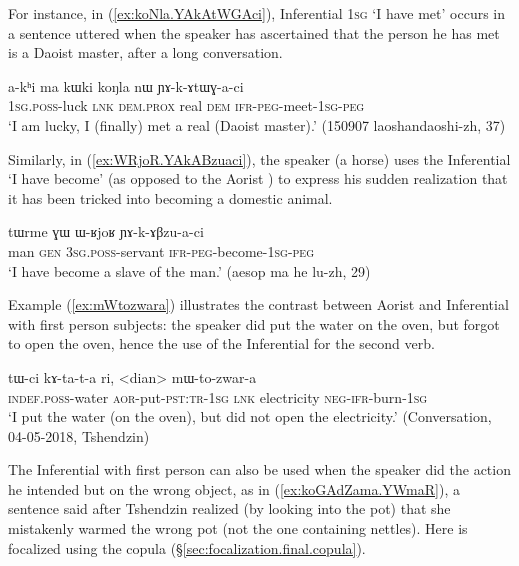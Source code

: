 For instance, in (\ref{ex:koNla.YAkAtWGAci}), Inferential \textsc{1sg}  `I have met' occurs in a sentence uttered when the speaker has ascertained that the person he has met is a Daoist master, after a long conversation.  

\begin{exe}
\ex \label{ex:koNla.YAkAtWGAci}
\gll  a-kʰi ma kɯki koŋla nɯ ɲɤ-k-ɤtɯɣ-a-ci \\
\textsc{1sg}.\textsc{poss}-luck \textsc{lnk} \textsc{dem}.\textsc{prox} real \textsc{dem} \textsc{ifr}-\textsc{peg}-meet-\textsc{1sg}-\textsc{peg} \\
\glt `I am lucky, I (finally) met a real (Daoist master).' (150907 laoshandaoshi-zh, 37)
\end{exe}

Similarly, in (\ref{ex:WRjoR.YAkABzuaci}), the speaker (a horse) uses the Inferential  `I have become' (as opposed to the Aorist ) to express his sudden realization that it has been tricked into becoming a domestic animal.

\begin{exe}
\ex \label{ex:WRjoR.YAkABzuaci}
\gll tɯrme ɣɯ ɯ-ʁjoʁ ɲɤ-k-ɤβzu-a-ci \\
man \textsc{gen} \textsc{3sg}.\textsc{poss}-servant \textsc{ifr}-\textsc{peg}-become-\textsc{1sg}-\textsc{peg} \\
\glt `I have become a slave of the man.' (aesop ma he lu-zh, 29)
\end{exe}

Example (\ref{ex:mWtozwara}) illustrates the contrast between Aorist and Inferential with first person subjects: the speaker did put the water on the oven, but forgot to open the oven, hence the use of the Inferential for the second verb.

\begin{exe}
\ex \label{ex:mWtozwara}
\gll tɯ-ci kɤ-ta-t-a ri, <dian> mɯ-to-zwar-a \\
\textsc{indef}.\textsc{poss}-water \textsc{aor}-put-\textsc{pst}:\textsc{tr}-\textsc{1sg} \textsc{lnk} electricity \textsc{neg}-\textsc{ifr}-burn-\textsc{1sg} \\
\glt `I put the water (on the oven), but did not open the electricity.' (Conversation, 04-05-2018, Tshendzin)
\end{exe}

The Inferential with first person can also be used when the speaker did the action he intended but on the wrong object, as in (\ref{ex:koGAdZama.YWmaR}), a sentence said after Tshendzin realized (by looking into the pot) that she mistakenly warmed the wrong pot (not the one containing nettles). Here  is focalized using the copula  (§\ref{sec:focalization.final.copula}).

